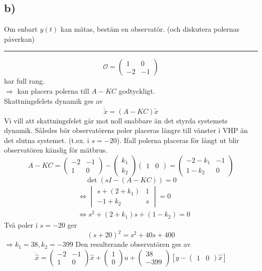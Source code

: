 \documentclass[12pt]{article}
\newcommand{\qline}{\hrule \vspace*{10pt}}
\begin{document}
\subsection*{b)}
Om enbart $y(t)$ kan mätas, bestäm en observatör. (och diskutera polernas påverkan)
\qline
\[\mathcal{O} = \begin{pmatrix}
1 & 0 \\
-2 & -1
\end{pmatrix} \]
har full rang. \\
$\Rightarrow$ kan placera polerna till $A-KC$ godtyckligt. \\
Skattningsfelets dynamik ges av
\[\dot{\tilde{x}} = (A-KC)\tilde{x}\]
Vi vill att skattningsfelet går mot noll snabbare än det styrda systemets dynamik. Således bör observatörens poler placeras längre till vänster i VHP än det slutna systemet. (t.ex. i $s = -20$). Ifall polerna placeras för långt ut blir observatören känslig för mätbrus.
\[A - KC = \begin{pmatrix}
-2 & -1 \\
1 & 0
\end{pmatrix} - \begin{pmatrix}
k_1 \\
k_2
\end{pmatrix} \begin{pmatrix}
1 & 0
\end{pmatrix} = \begin{pmatrix}
-2 -k_1 & -1 \\
1 - k_2 & 0
\end{pmatrix} \]
\[\det{(sI-(A-KC))} = 0\]
\begin{align*}
&\Leftrightarrow \begin{vmatrix}
s + (2+k_1) & 1 \\
-1+k_2 & s
\end{vmatrix} = 0 \\
&\Leftrightarrow s^2 + (2+k_1)s + (1-k_2) = 0
\end{align*}
Två poler i $s = -20$ ger
\[(s+20)^2 = s^2 + 40s + 400\]
$\Rightarrow k_1 = 38, k_2 = -399$
Den resulterande observatören ges av
\[\dot{\hat{x}} = \begin{pmatrix}
-2 & -1 \\
1 & 0
\end{pmatrix}\hat{x} + \begin{pmatrix}
1 \\
0
\end{pmatrix}u + \begin{pmatrix}
38 \\
-399
\end{pmatrix} [y - \begin{pmatrix}
1 & 0
\end{pmatrix}\hat{x}] \]
\end{document}
